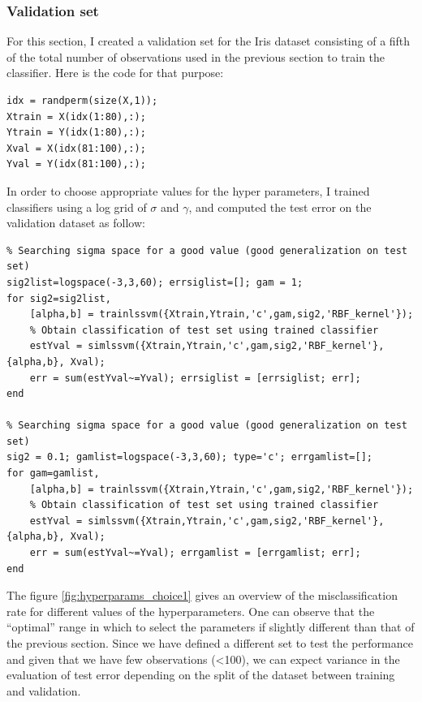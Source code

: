 \documentclass[11pt, a4paper]{article}
\begin{document}
\subsubsection{Validation set}

For this section, I created a validation set for the Iris dataset
consisting of a fifth of the total number of observations used in the
previous section to train the classifier. Here is the code for that
purpose:

\begin{lstlisting}
idx = randperm(size(X,1));
Xtrain = X(idx(1:80),:);
Ytrain = Y(idx(1:80),:);
Xval = X(idx(81:100),:);
Yval = Y(idx(81:100),:);
\end{lstlisting}

In order to choose appropriate values for the hyper parameters, I
trained classifiers using a log grid of $\sigma$ and $\gamma$, and
computed the test error on the validation dataset as follow:

\begin{lstlisting}
% Searching sigma space for a good value (good generalization on test set)
sig2list=logspace(-3,3,60); errsiglist=[]; gam = 1;
for sig2=sig2list,
    [alpha,b] = trainlssvm({Xtrain,Ytrain,'c',gam,sig2,'RBF_kernel'});
    % Obtain classification of test set using trained classifier
    estYval = simlssvm({Xtrain,Ytrain,'c',gam,sig2,'RBF_kernel'}, {alpha,b}, Xval);
    err = sum(estYval~=Yval); errsiglist = [errsiglist; err]; 
end

% Searching sigma space for a good value (good generalization on test set)
sig2 = 0.1; gamlist=logspace(-3,3,60); type='c'; errgamlist=[];
for gam=gamlist,
    [alpha,b] = trainlssvm({Xtrain,Ytrain,'c',gam,sig2,'RBF_kernel'});
    % Obtain classification of test set using trained classifier
    estYval = simlssvm({Xtrain,Ytrain,'c',gam,sig2,'RBF_kernel'}, {alpha,b}, Xval);
    err = sum(estYval~=Yval); errgamlist = [errgamlist; err];
end
\end{lstlisting}

The figure \ref{fig:hyperparams_choice1} gives an overview of the
misclassification rate for different values of the
hyperparameters. One can observe that the ``optimal'' range in which
to select the parameters if slightly different than that of the
previous section. Since we have defined a different set to test the
performance and given that we have few observations (\textless 100),
we can expect variance in the evaluation of test error depending on
the split of the dataset between training and validation.
\end{document}
